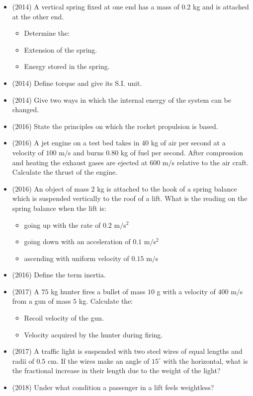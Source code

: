 \documentclass{article}
\begin{document}
\begin{itemize}
\item (2014)  A vertical spring fixed at one end has a mass of $ 0.2$ kg and is attached at the other end.
 \begin{itemize}
\item Determine the:
\item Extension of the spring.
\item Energy stored in the spring.
\end{itemize}
\item (2014)  Define torque and give its S.I. unit.
\item (2014)  Give two ways in which the internal energy of the system can be changed.
\item (2016)  State the principles on which the rocket propulsion is based. 
\item (2016)  A jet engine on a test bed takes in $ 40$ kg of air per second at a velocity of $ 100$ m$/$s  and burns $ 0.80$ kg of fuel per second. After compression and heating the exhaust gases are ejected at $ 600$ m$/$s relative to the air craft. Calculate the thrust of the engine.
\item (2016)  An object of mass $ 2$ kg is attached to the hook of a spring balance which is suspended vertically to the roof of a lift.  What is the reading on the spring balance when the lift is:
 \begin{itemize}
\item going up with the rate of $ 0.2$ m$/$s$ ^{2}$
\item going down with an acceleration of $ 0.1$ m$/$s$ ^{2}$
\item ascending with uniform velocity of $ 0.15$ m$/$s
\end{itemize}
\item (2016)  Define the term inertia.
\item (2017)  A $ 75$ kg hunter fires a bullet of mass $ 10$ g with a velocity of $ 400$ m$/$s from a gun of mass $ 5$ kg. Calculate the:
 \begin{itemize}
\item Recoil velocity of the gun. 
\item Velocity acquired by the hunter during firing.
\end{itemize}
\item (2017)  A traffic light is suspended with two steel wires of equal lengths and radii of $ 0.5$ cm. If the wires make an angle of $ 15^{\circ}$ with the horizontal, what is the fractional increase in their length due to the weight of the light? 
\item (2018)  Under what condition a passenger in a lift feels weightless? 

\end{itemize}
\end{document}
